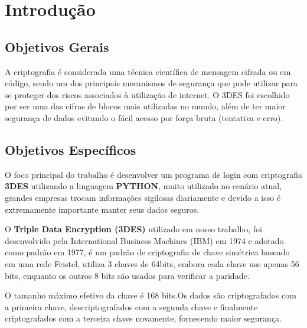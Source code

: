 




\textual\newpage
\chapter{\textbf{Introdução}}

\section{\textbf{Objetivos Gerais}}
\par A criptografia é considerada uma técnica científica de mensagem cifrada ou em código, sendo um dos principais mecanismos de segurança que pode utilizar para se proteger dos riscos associados à utilização de internet. O 3DES foi escolhido por ser uma das cifras de blocos mais utilizadas no mundo, além de ter maior segurança de dados evitando o fácil acesso por força bruta (tentativa e erro).

\section{\textbf{Objetivos Específicos}}
\par O foco principal do trabalho é desenvolver um programa de login com criptografia \textbf{3DES} utilizando a linguagem \textbf{PYTHON}, muito utilizado no cenário atual, grandes empresas trocam informações sigilosas diariamente e devido a isso é extremamente importante manter seus dados seguros. 

\par O \textbf{Triple Data Encryption (3DES)} utilizado em nosso trabalho, foi desenvolvido pela International Business Machines (IBM) em 1974 e adotado como padrão em 1977, é um padrão de criptografia de chave simétrica baseado em uma rede Feistel, utiliza 3 chaves de 64bits, embora cada chave use apenas 56 bits, enquanto os outros 8 bits são usados para verificar a paridade.

\par O tamanho máximo efetivo da chave é 168 bits.Os dados são criptografados com a primeira chave, descriptografados com a segunda chave e finalmente criptografados com a terceira chave novamente, fornecendo maior segurança. 

